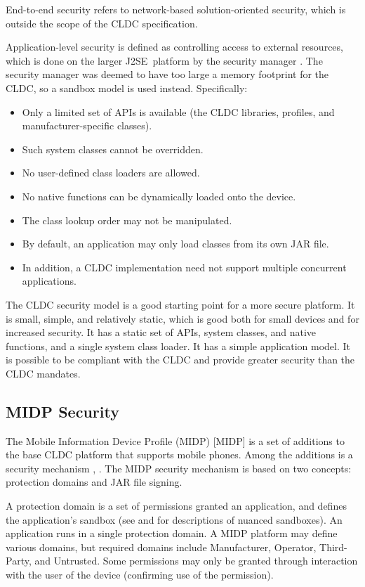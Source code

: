 \documentclass{llncs}
\begin{document}
End-to-end security refers to network-based solution-oriented
security, which is outside the scope of the CLDC specification.

Application-level security is defined as controlling access to
external resources, which is done on the larger J2SE~\texttrademark platform by
the security manager \cite{j2ps}. The security manager was deemed to
have too large a memory footprint for the CLDC, so a sandbox model
is used instead. Specifically:

\begin{itemize}
  \item Only a limited set of APIs is available (the CLDC
	libraries, profiles, and manufacturer-specific classes).
  \item  Such system classes cannot be overridden.
  \item No user-defined class loaders are allowed.
  \item No native functions can be dynamically loaded onto the device.
  \item The class lookup order may not be manipulated.
  \item By default, an application may only load classes from its own JAR file.
  \item In addition, a CLDC implementation need not support multiple concurrent applications.
\end{itemize}

The CLDC security model is a good starting point for a more secure
platform. It is small, simple, and relatively static, which is good
both for small devices and for increased security. It has a static
set of APIs, system classes, and native functions, and a single
system class loader. It has a simple application model. It is
possible to be compliant with the CLDC and provide greater security
than the CLDC mandates.

\subsection{MIDP Security}


The Mobile Information Device Profile (MIDP) [MIDP] is a set of
additions to the base CLDC platform that supports mobile phones.
Among the additions is a security mechanism \cite{kolsi}, \cite{knudsen}.
The MIDP security mechanism is based on two concepts: protection domains and
JAR file signing.

A protection domain is a set of permissions granted an application,
and defines the application's sandbox (see \cite{acharya} and \cite{peterson}
for descriptions
of nuanced sandboxes). An application runs in a single protection
domain. A MIDP platform may define various domains, but required
domains include Manufacturer, Operator, Third-Party, and Untrusted.
Some permissions may only be granted through interaction with the
user of the device (confirming use of the permission).
\end{document}

